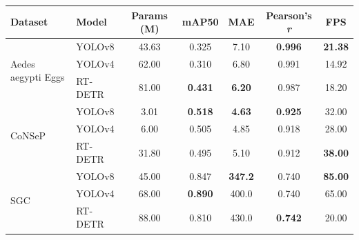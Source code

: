 \begin{tabular}{llccccc}
\toprule
\textbf{Dataset} & \textbf{Model} & \textbf{Params (M)} & \textbf{mAP50} & \textbf{MAE} &\textbf{ Pearson's \textit{r}} & \textbf{FPS} \\
\midrule

\multirow{3}{*}{Aedes aegypti Eggs \cite{vicente2024aedesaegyptieggcounting}} 
  & YOLOv8 \cite{yolov8} & 43.63 & 0.325 & 7.10 & \textbf{0.996} & \textbf{21.38} \\
  & YOLOv4 \cite{Bochkovskiy2020YOLOv4} & 62.00 & 0.310  & 6.80  & 0.991 & 14.92 \\
  & RT-DETR \cite{Zhao2023RTDETR} & 81.00 & \textbf{0.431} & \textbf{6.20}   & 0.987 & 18.20 \\
\midrule

\multirow{3}{*}{CoNSeP \cite{Tyagi2023}} 
  & YOLOv8 \cite{yolov8} & 3.01  & \textbf{0.518} & \textbf{4.63}  & \textbf{0.925} & 32.00 \\
  & YOLOv4 \cite{Bochkovskiy2020YOLOv4} & 6.00  & 0.505 & 4.85  & 0.918 & 28.00 \\
  & RT-DETR \cite{Zhao2023RTDETR} & 31.80 & 0.495 & 5.10 & 0.912 & \textbf{38.00} \\
  \midrule

\multirow{3}{*}{SGC \cite{Bakshi2025}} 
  & YOLOv8 \cite{yolov8} & 45.00 & 0.847 & \textbf{347.2} & 0.740  & \textbf{85.00} \\
  & YOLOv4 \cite{Bochkovskiy2020YOLOv4} & 68.00 & \textbf{0.890}  & 400.0 & 0.740  & 65.00 \\
  & RT-DETR \cite{Zhao2023RTDETR} & 88.00 & 0.810 & 430.0 & \textbf{0.742} & 20.00 \\
\bottomrule
\end{tabular}
